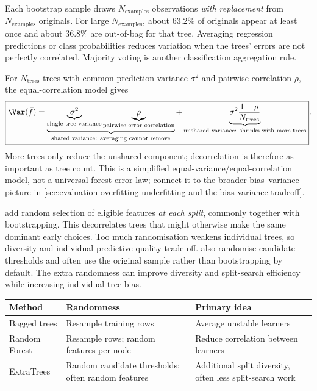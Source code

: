 Each bootstrap sample draws $N_{\text{examples}}$ observations \emph{with replacement} from $N_{\text{examples}}$ originals.
For large $N_{\text{examples}}$, about $63.2\%$ of originals appear at least once and about $36.8\%$ are out-of-bag for that tree.
Averaging regression predictions or class probabilities reduces variation when the trees' errors are not perfectly correlated.
Majority voting is another classification aggregation rule.

For $N_{\text{trees}}$ trees with common prediction variance $\sigma^2$ and pairwise correlation $\rho$, the equal-correlation model gives
\begin{equation}
\boxed{
\Var(\bar f)
=
\underbrace{
\underbrace{\sigma^2}_{\text{single-tree variance}}
\underbrace{\rho}_{\text{pairwise error correlation}}
}_{\text{shared variance: averaging cannot remove}}
+
\underbrace{
\sigma^2\frac{1-\rho}{N_{\text{trees}}}
}_{\text{unshared variance: shrinks with more trees}}
}.
\end{equation}
More trees only reduce the unshared component; decorrelation is therefore as important as tree count.
This is a simplified equal-variance/equal-correlation model, not a universal forest error law; connect it to the broader bias--variance picture in \cref{sec:evaluation-overfitting-underfitting-and-the-bias-variance-tradeoff}.

 add random selection of eligible features \emph{at each split}, commonly together with bootstrapping.
This decorrelates trees that might otherwise make the same dominant early choices.
Too much randomisation weakens individual trees, so diversity and individual predictive quality trade off.
 also randomise candidate thresholds and often use the original sample rather than bootstrapping by default.
The extra randomness can improve diversity and split-search efficiency while increasing individual-tree bias.

\begin{center}\small
\begin{tabularx}{\linewidth}{@{}L{.20\linewidth}YY@{}}\toprule
Method & Randomness & Primary idea\\\midrule
Bagged trees & Resample training rows & Average unstable learners\\
Random Forest & Resample rows; random features per node & Reduce correlation between learners\\
ExtraTrees & Random candidate thresholds; often random features & Additional split diversity, often less split-search work\\\bottomrule
\end{tabularx}
\end{center}

